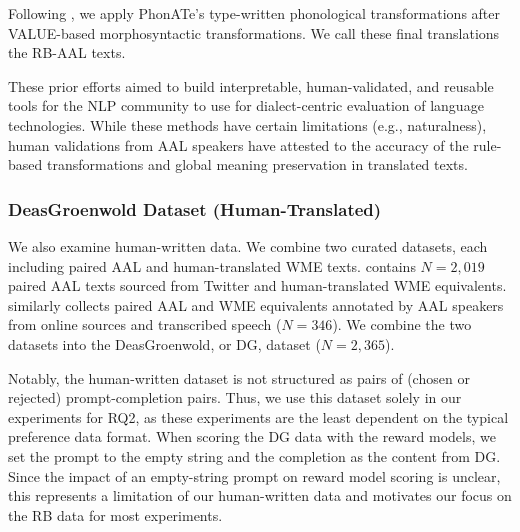 Following \citet{deas2024phonate}, we apply PhonATe's type-written phonological transformations after VALUE-based morphosyntactic transformations. We call these final translations the \textsc{RB-AAL} texts.

These prior efforts aimed to build interpretable, human-validated, and reusable tools for the NLP community to use for dialect-centric evaluation of language technologies. While these methods have certain limitations (e.g., naturalness), human validations from AAL speakers have attested to the accuracy of the rule-based transformations and global meaning preservation in translated texts. 

\subsubsection{DeasGroenwold Dataset (Human-Translated)}
We also examine human-written data. We combine two curated datasets, each including paired AAL and human-translated WME texts. \citet{groenwold-etal-2020-investigating} contains $N=2,019$ paired AAL texts sourced from Twitter and human-translated WME equivalents. \citet{deas_evaluation_2023} similarly collects paired AAL and WME equivalents annotated by AAL speakers from online sources and transcribed speech ($N=346$). We combine the two datasets into the DeasGroenwold, or \textsc{DG}, dataset ($N=2,365$).

Notably, the human-written dataset is not structured as pairs of (chosen or rejected) prompt-completion pairs. Thus, we use this dataset solely in our experiments for RQ2, as these experiments are the least dependent on the typical preference data format. When scoring the \textsc{DG} data with the reward models, we set the prompt to the empty string and the completion as the content from DG. Since the impact of an empty-string prompt on reward model scoring is unclear, this represents a limitation of our human-written data and motivates our focus on the \textsc{RB} data for most experiments.

